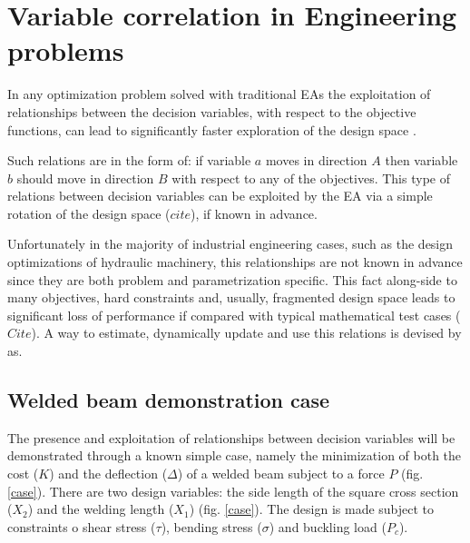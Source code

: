 \ifpdf
    \graphicspath{{3/figures/PNG/}{3/figures/PDF/}{3/figures/}}
\else
    \graphicspath{{3/figures/EPS/}{3/figures/}}
\fi

\chapter{Variable correlation in Engineering problems} %
In any optimization problem solved with traditional EAs the exploitation of relationships between the decision variables, with respect to the objective functions, can lead to significantly faster exploration of the design space \cite{Salomon,Roy_2002a,Ghisu_2010}. 


Such relations are in the form of: if variable $a$ moves in direction $A$ then variable $b$ should move in direction $B$ with respect to any of the objectives. This type of relations between decision variables can be exploited by the EA via a simple rotation of the design space ($cite$), if known in advance. 

Unfortunately in the majority of industrial engineering cases, such as the design optimizations of hydraulic machinery, this relationships are not known in advance since they are both problem and parametrization specific. This fact along-side to many objectives, hard constraints and, usually, fragmented design space leads to significant loss of performance if compared with typical mathematical test cases ($Cite$). A way to estimate, dynamically update and use this relations is devised by as.

\section{Welded beam demonstration case}
The presence and exploitation of relationships between decision variables will be demonstrated through a known simple case, namely the minimization of both the cost ($K$) and the deflection ($\Delta$) of a welded beam subject to a force $P$ (fig. \ref{case}). There are two design variables: the side length of the square cross section ($X_2$) and the welding length ($X_1$) (fig. \ref{case}). The design is made subject to constraints o shear stress ($\tau$), bending stress ($\sigma$) and buckling load ($P_c$).   


